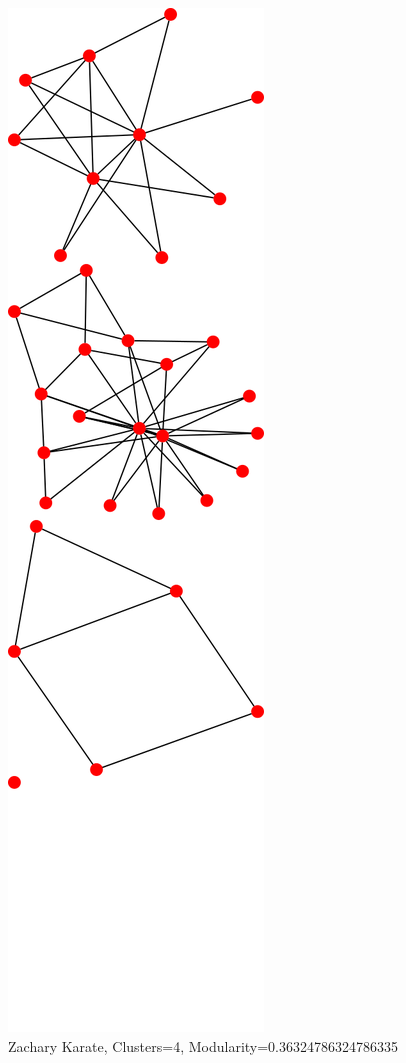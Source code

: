 \documentclass{article}
\begin{document}
\begin{figure}[H]
  \centering
  \caption{Zachary Karate, Clusters=4, Modularity=0.36324786324786335}
  \includegraphics[scale=.25]{4-karate.png}
\end{figure}
\clearpage
\end{document}
